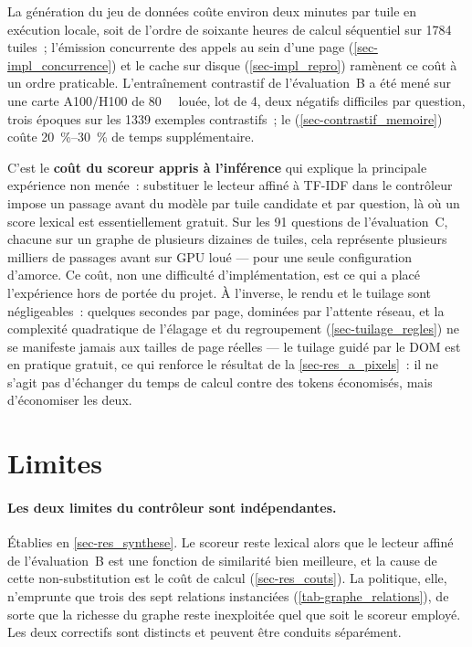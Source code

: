 La génération du jeu de données coûte environ deux minutes par tuile en
exécution locale, soit de l'ordre de soixante heures de calcul séquentiel sur
\num{1784} tuiles~; l'émission concurrente des appels au sein d'une page
(\cref{sec-impl_concurrence}) et le cache sur disque (\cref{sec-impl_repro})
ramènent ce coût à un ordre praticable. L'entraînement contrastif de
l'évaluation~B a été mené sur une carte A100/H100 de \SI{80}{\giga\byte}
louée, lot de \num{4}, deux négatifs difficiles par question, trois époques
sur les \num{1339} exemples contrastifs~; le 
(\cref{sec-contrastif_memoire}) coûte \SIrange{20}{30}{\percent} de temps
supplémentaire.

C'est le \textbf{coût du scoreur appris à l'inférence} qui explique la
principale expérience non menée~: substituer le lecteur affiné à TF-IDF dans
le contrôleur impose un passage avant du modèle par tuile candidate et par
question, là où un score lexical est essentiellement gratuit. Sur les
\num{91} questions de l'évaluation~C, chacune sur un graphe de plusieurs
dizaines de tuiles, cela représente plusieurs milliers de passages avant sur
GPU loué --- pour une seule configuration d'amorce. Ce coût, non une
difficulté d'implémentation, est ce qui a placé l'expérience hors de portée
du projet. À l'inverse, le rendu et le tuilage sont négligeables~: quelques
secondes par page, dominées par l'attente réseau, et la complexité
quadratique de l'élagage et du regroupement (\cref{sec-tuilage_regles}) ne se
manifeste jamais aux tailles de page réelles --- le tuilage guidé par le DOM
est en pratique gratuit, ce qui renforce le résultat de la \cref{sec-res_a_pixels}~: il ne s'agit pas d'échanger du temps de calcul
contre des tokens économisés, mais d'économiser les deux.

\section{Limites}
\label{sec-res_limites}

\paragraph{Les deux limites du contrôleur sont indépendantes.} Établies en
\cref{sec-res_synthese}. Le scoreur reste lexical alors que le lecteur affiné
de l'évaluation~B est une fonction de similarité bien meilleure, et la cause de
cette non-substitution est le coût de calcul (\cref{sec-res_couts}). La
politique, elle, n'emprunte que trois des sept relations instanciées
(\cref{tab-graphe_relations}), de sorte que la richesse du graphe reste
inexploitée quel que soit le scoreur employé. Les deux correctifs sont
distincts et peuvent être conduits séparément.

